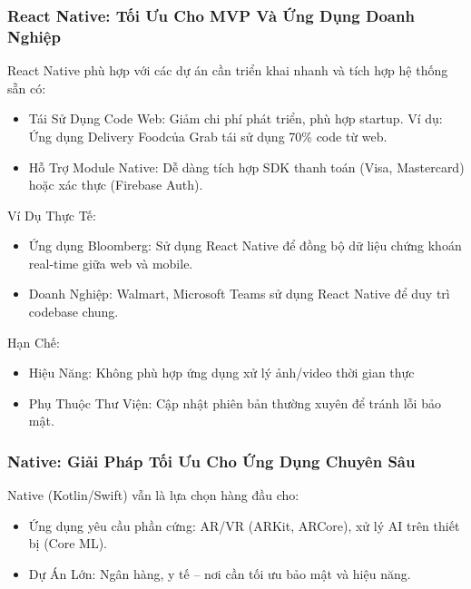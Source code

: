 \subsubsection{React Native: Tối Ưu Cho MVP Và Ứng Dụng Doanh Nghiệp}
    \begin{flushleft}
      \hspace*{0.8cm}React Native phù hợp với các dự án cần triển khai nhanh và tích hợp hệ thống sẵn có:
      \setlength{\leftmargini}{1.5cm}
      \begin{itemize}
        \item Tái Sử Dụng Code Web: Giảm chi phí phát triển, phù hợp startup. Ví dụ: Ứng dụng Delivery Foodcủa Grab tái sử dụng 70\% code từ web.
        \item Hỗ Trợ Module Native: Dễ dàng tích hợp SDK thanh toán (Visa, Mastercard) hoặc xác thực (Firebase Auth).
      \end{itemize}
    \end{flushleft}

    \begin{flushleft}
      \hspace*{0.8cm}Ví Dụ Thực Tế:
      \setlength{\leftmargini}{1.5cm}
      \begin{itemize}
          \item Ứng dụng Bloomberg: Sử dụng React Native để đồng bộ dữ liệu chứng khoán real-time giữa web và mobile.
          \item Doanh Nghiệp: Walmart, Microsoft Teams sử dụng React Native để duy trì codebase chung.
      \end{itemize}
    \end{flushleft}

    \begin{flushleft}
      \hspace*{0.8cm}Hạn Chế:
      \setlength{\leftmargini}{1.5cm}
      \begin{itemize}
          \item Hiệu Năng: Không phù hợp ứng dụng xử lý ảnh/video thời gian thực
          \item Phụ Thuộc Thư Viện: Cập nhật phiên bản thường xuyên để tránh lỗi bảo mật.
      \end{itemize}
    \end{flushleft}

    \subsubsection{Native: Giải Pháp Tối Ưu Cho Ứng Dụng Chuyên Sâu}
    \begin{flushleft}
      \hspace*{0.8cm}Native (Kotlin/Swift) vẫn là lựa chọn hàng đầu cho:
      \setlength{\leftmargini}{1.5cm}
      \begin{itemize}
        \item Ứng dụng yêu cầu phần cứng: AR/VR (ARKit, ARCore), xử lý AI trên thiết bị (Core ML).
        \item Dự Án Lớn: Ngân hàng, y tế – nơi cần tối ưu bảo mật và hiệu năng.
      \end{itemize}
    \end{flushleft}

